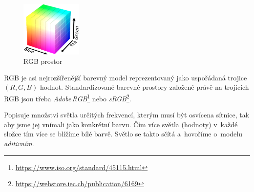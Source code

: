 \documentclass[11pt, a4paper, titlepage]{article}
\begin{document}
\begin{figure}
    \centering
    \vspace{-1cm}
    \includegraphics[width=3cm]{RGB_cube.png}
    \caption{RGB prostor \cite{wiki:RGB_color_model}}
\end{figure}

RGB je asi nejrozšířenější barevný model reprezentovaný jako uspořádaná trojice $(R,G,B)$ hodnot.
Standardizované barevné prostory založené právě na trojicích RGB jsou třeba \emph{Adobe\,RGB}\footnote{\url{https://www.iso.org/standard/45115.html}} nebo \emph{sRGB}\footnote{\url{https://webstore.iec.ch/publication/6169}}.

Popisuje množství světla určitých frekvencí, kterým musí být osvícena sítnice, tak aby jsme jej vnímali jako konkrétní barvu.
Čím více světla (hodnoty) v~každé složce tím více se blížíme bílé barvě.
Světlo se takto sčítá a~hovoříme o~modelu \emph{aditivním}.
\end{document}
